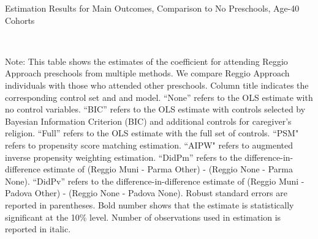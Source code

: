 \begin{table}[H] \caption{Estimation Results for Main Outcomes, Comparison to No Preschools, Age-40 Cohorts} \label{ols-M-adult40-reg-nopres}
\scalebox{0.65}{}
\vspace{1ex} \\
\footnotesize\raggedright{Note: This table shows the estimates of the coefficient for attending Reggio Approach preschools from multiple methods. We compare Reggio Approach individuals with those who attended other preschools. Column title indicates the corresponding control set and and model. ``None'' refers to the OLS estimate with no control variables. ``BIC'' refers to the OLS estimate with controls selected by Bayesian Information Criterion (BIC) and additional controls for caregiver's religion. ``Full'' refers to the OLS estimate with the full set of controls. ``PSM" refers to propensity score matching estimation. ``AIPW" refers to augmented inverse propensity weighting estimation. ``DidPm'' refers to the difference-in-difference estimate of (Reggio Muni - Parma Other) - (Reggio None - Parma None). ``DidPv'' refers to the difference-in-difference estimate of (Reggio Muni - Padova Other) - (Reggio None - Padova None). Robust standard errors are reported in parentheses. Bold number shows that the estimate is statistically significant at the 10\% level. Number of observations used in estimation is reported in italic.}
\end{table}


